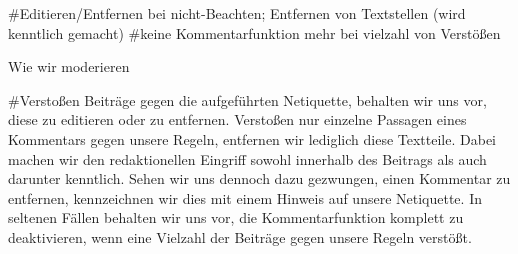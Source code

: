 #Editieren/Entfernen bei nicht-Beachten; Entfernen von Textstellen (wird kenntlich gemacht)
#keine Kommentarfunktion mehr bei vielzahl von Verstößen


Wie wir moderieren

#Verstoßen Beiträge gegen die aufgeführten Netiquette, behalten wir uns vor, diese zu editieren oder zu entfernen. Verstoßen nur einzelne Passagen eines Kommentars gegen unsere Regeln, entfernen wir lediglich diese Textteile. Dabei machen wir den redaktionellen Eingriff sowohl innerhalb des Beitrags als auch darunter kenntlich. Sehen wir uns dennoch dazu gezwungen, einen Kommentar zu entfernen, kennzeichnen wir dies mit einem Hinweis auf unsere Netiquette. In seltenen Fällen behalten wir uns vor, die Kommentarfunktion komplett zu deaktivieren, wenn eine Vielzahl der Beiträge gegen unsere Regeln verstößt. 
